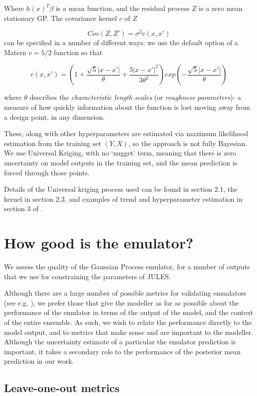 \documentclass[gmd, manuscript]{copernicus}
\begin{document}
Where $h(x)^T \beta$ is a mean function, and the residual process $Z$ is a zero mean stationary GP. The covariance kernel $c$ of $Z$ 

$$
Cov(Z, Z') = \sigma^2 c(x,x')
$$
can be specified in a number of different ways: we use the default option of a Matern $v=5/2$ function so that

$$
c(x,x') = (1 + \frac{\sqrt{5} | x - x'|}{\theta} + \frac{5 | x - x'|^2}{3 \theta^2})exp(- \frac{\sqrt{5} |x-x'|}{\theta})
$$

where $\theta$ describes the \emph{characteristic length scales} (or \emph{roughness parameters})- a measure of how quickly information about the function is lost moving away from a design point, in any dimension. 

These, along with other hyperparameters are estimated via maximum likelihood estimation from the training set $(Y, X)$, so the approach is not fully Bayesian. We use Universal Kriging, with no `nugget' term, meaning that there is zero uncertainty on model outputs in the training set, and the mean prediction is forced through those points. 

Details of the Universal kriging process used can be found in section 2.1, the kernel in section 2.3, and examples of trend and hyperparameter estimation in section 3 of \cite{roustant2012dicekriging}. 


\section{How good is the emulator?}\label{app:emulator_accuracy}    %

We assess the quality of the Gaussian Process emulator, for a number of outputs that we use for constraining the parameters of JULES.

Although there are a large number of possible metrics  for validating emualators (see e.g. \cite{al2018diagnostics}), we prefer those that give the modeller as far as possible about the performance of the emulator in terms of the output of the model, and the context of the entire ensemble. As such, we wish to relate the performance directly to the model output, and to metrics that make sense and are important to the modeller. Although the uncertainty estimate of a particular the emulator prediction is important, it takes a secondary role to the performance of the posterior mean prediction in our work.

\subsection{Leave-one-out metrics}\label{app:leave_one_out}     %
\end{document}
